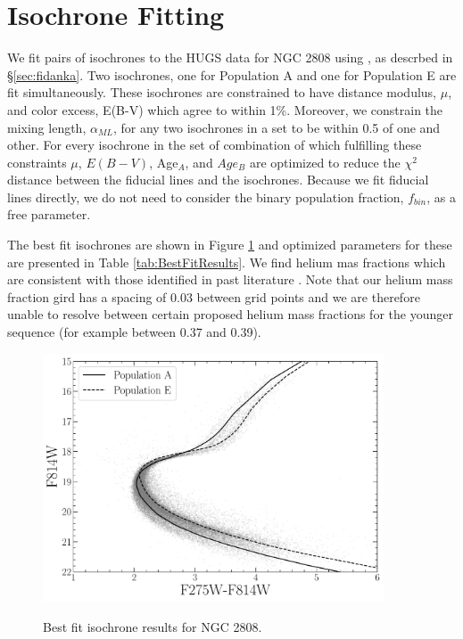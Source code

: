 \section{Isochrone Fitting}\label{sec:isoFit}
We fit pairs of isochrones to the HUGS data for NGC 2808 using \fidanka, as
descrbed in \S \ref{sec:fidanka}. Two isochrones, one for Population
A and one for Population E are fit simultaneously. These isochrones are
constrained to have distance modulus, $\mu$, and color excess, E(B-V) which
agree to within 1\%. Moreover, we constrain the mixing length, $\alpha_{ML}$, for any two isochrones in a set to be within 0.5 of one and other. For every isochrone in the
set of combination of which fulfilling these constraints $\mu$, $E(B-V)$,
Age$_{A}$, and $Age_{B}$ are optimized to reduce the $\chi^{2}$ distance
between the fiducial lines and the isochrones. Because we fit fiducial lines
directly, we do not need to consider the binary population fraction, $f_{bin}$,
as a free parameter.

The best fit isochrones are shown in Figure \ref{fig:BestFitResults} and optimized
parameters for these are presented in Table \ref{tab:BestFitResults}. We find helium mas fractions which are consistent with those identified in past literature \citep[e.g.][]{Milone2015}. Note that our helium mass fraction gird has a spacing of 0.03 between grid points and we are therefore unable to resolve between certain proposed helium mass fractions for the younger sequence (for example between 0.37 and 0.39).

\begin{figure}
  \centering
  \includegraphics[width=0.9\textwidth]{figures/ngc2808/BestFitResults.pdf}
  \label{fig:BestFitResults}
  \caption{Best fit isochrone results for NGC 2808.}
\end{figure}

